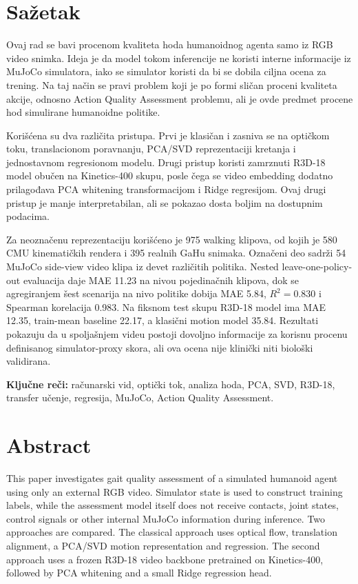 \documentclass[12pt,a4paper]{report}
\begin{document}
\chapter*{Sažetak}
Ovaj rad se bavi procenom kvaliteta hoda humanoidnog agenta samo iz RGB video
snimka. Ideja je da model tokom inferencije ne koristi interne informacije iz
MuJoCo simulatora, iako se simulator koristi da bi se dobila ciljna ocena za
trening. Na taj način se pravi problem koji je po formi sličan proceni kvaliteta
akcije, odnosno Action Quality Assessment problemu, ali je ovde predmet procene
hod simulirane humanoidne politike.

Korišćena su dva različita pristupa. Prvi je klasičan i zasniva se na optičkom
toku, translacionom poravnanju, PCA/SVD reprezentaciji kretanja i jednostavnom
regresionom modelu. Drugi pristup koristi zamrznuti R3D-18 model obučen na
Kinetics-400 skupu, posle čega se video embedding dodatno prilagođava PCA
whitening transformacijom i Ridge regresijom. Ovaj drugi pristup je manje
interpretabilan, ali se pokazao dosta boljim na dostupnim podacima.

Za neoznačenu reprezentaciju korišćeno je 975 walking klipova, od kojih je 580
CMU kinematičkih rendera i 395 realnih GaHu snimaka. Označeni deo sadrži 54
MuJoCo side-view video klipa iz devet različitih politika. Nested
leave-one-policy-out evaluacija daje MAE 11.23 na nivou pojedinačnih klipova,
dok se agregiranjem šest scenarija na nivo politike dobija MAE 5.84,
$R^2=0.830$ i Spearman korelacija 0.983. Na fiksnom test skupu R3D-18 model ima
MAE 12.35, train-mean baseline 22.17, a klasični motion model 35.84. Rezultati
pokazuju da u spoljašnjem videu postoji dovoljno informacije za korisnu procenu
definisanog simulator-proxy skora, ali ova ocena nije klinički niti biološki
validirana.

\noindent\textbf{Ključne reči:} računarski vid, optički tok, analiza hoda, PCA,
SVD, R3D-18, transfer učenje, regresija, MuJoCo, Action Quality Assessment.

\clearpage

\chapter*{Abstract}
This paper investigates gait quality assessment of a simulated humanoid agent
using only an external RGB video. Simulator state is used to construct training
labels, while the assessment model itself does not receive contacts, joint
states, control signals or other internal MuJoCo information during inference.
Two approaches are compared. The classical approach uses optical flow,
translation alignment, a PCA/SVD motion representation and regression. The
second approach uses a frozen R3D-18 video backbone pretrained on Kinetics-400,
followed by PCA whitening and a small Ridge regression head.
\end{document}
